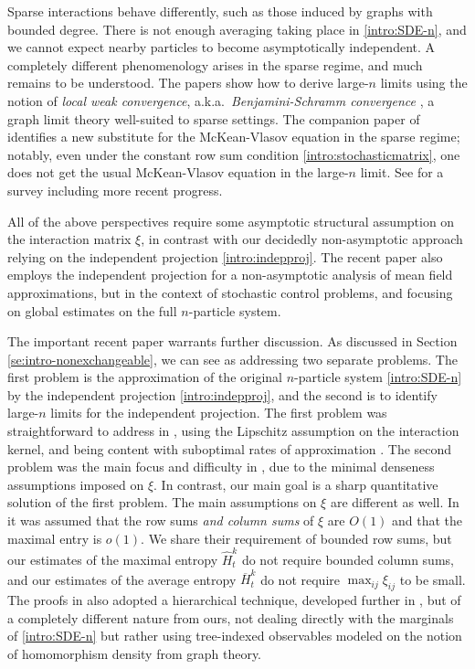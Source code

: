\documentclass[11pt,reqno]{amsart}
\numberwithin{equation}{section}
\theoremstyle{definition}
\begin{document}
Sparse interactions behave differently, such as those induced by graphs with bounded degree. There is not enough averaging taking place in \eqref{intro:SDE-n}, and we cannot expect nearby particles to become asymptotically independent.
A completely different phenomenology arises in the sparse regime, and much remains to be understood. The papers \cite{oliveira2020interacting,lacker2023local} show how to derive large-$n$ limits using the notion of \emph{local weak convergence}, a.k.a.\ \emph{Benjamini-Schramm convergence} \cite{benjamini2011recurrence}, a graph limit theory well-suited to sparse settings. The companion paper \cite{lacker2023marginal} of \cite{lacker2023local} identifies a new substitute for the McKean-Vlasov equation in the sparse regime; notably, even under the constant row sum condition \eqref{intro:stochasticmatrix}, one does not get the usual McKean-Vlasov equation in the large-$n$ limit.
 See \cite{ramanan2023interacting} for a survey including more recent progress.
 

All of the above perspectives require some asymptotic structural assumption on the interaction matrix $\xi$, in contrast with our decidedly non-asymptotic approach relying on the independent projection \eqref{intro:indepproj}. The recent paper \cite{jackson2023approximately} also employs the independent projection for a non-asymptotic analysis of mean field approximations, but in the context of stochastic control problems, and focusing on global estimates on the full $n$-particle system.


The important recent paper \cite{jabin2021mean} warrants further discussion.
As discussed in Section \ref{se:intro-nonexchangeable}, we can see \cite{jabin2021mean} as addressing two separate problems. The first problem is the  approximation of the original $n$-particle system \eqref{intro:SDE-n} by the independent projection \eqref{intro:indepproj}, and the second is to identify large-$n$ limits for the independent projection.
The first problem was straightforward to address in \cite{jabin2021mean}, using the Lipschitz assumption on the interaction kernel, and being content with suboptimal rates of approximation \cite[Proposition 2.2]{jabin2021mean}.
The second problem was the main focus and difficulty in  \cite{jabin2021mean}, due to the minimal denseness assumptions imposed on $\xi$.
In contrast, our main goal is a sharp quantitative solution of the first problem. 
The main assumptions on $\xi$ are different as well. In \cite{jabin2021mean} it was assumed that the row sums \emph{and column sums} of $\xi$ are $O(1)$ and that the maximal entry is $o(1)$. We share their requirement of bounded row sums, but our estimates of the maximal entropy $\widehat{H}^k_t$ do not require bounded column sums, and our estimates of the average entropy $\overline{H}^k_t$ do not require $\max_{ij}\xi_{ij}$ to be small.
The proofs in \cite{jabin2021mean} also adopted a hierarchical technique, developed further in \cite{jabin2023mean}, but of a completely different nature from ours, not dealing directly with the marginals of \eqref{intro:SDE-n} but rather using tree-indexed observables modeled on the notion of homomorphism density from graph theory.
\end{document}
